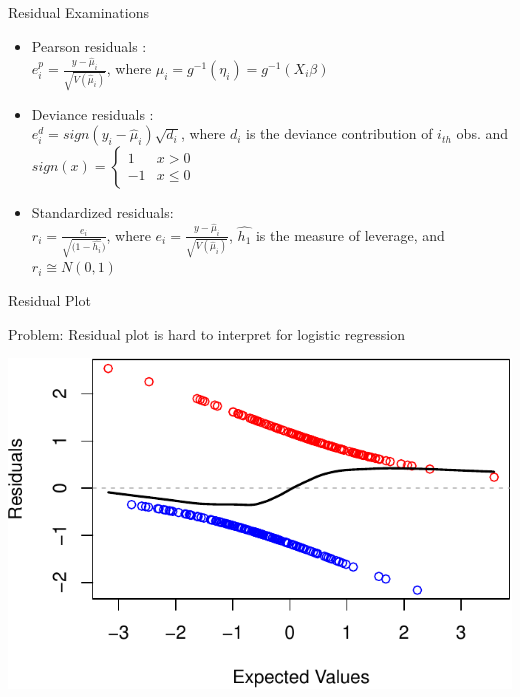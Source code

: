 \documentclass[ignorenonframetext,]{beamer}
\begin{document}
\begin{frame}{Residual Examinations}

\begin{itemize}
\item
  Pearson residuals :\\
  \(e_{i}^p=\frac{y-\hat\mu_{i}}{\sqrt{V(\hat\mu_{i})}}\), where
  \(\mu_i=g^{-1}(\eta_i)=g^{-1}(X_i\beta)\)
\item
  Deviance residuals :\\
  \(e_{i}^d= sign(y_i-\hat\mu_i)\sqrt{d_i}\), where \(d_i\) is the
  deviance contribution of \(i_{th}\) obs. and
  \(sign(x)=\begin{cases}1 & x>0\\-1 & x\le0\end{cases}\)
\item
  Standardized residuals:\\
  \(r_{i}= \frac{e_i}{\sqrt{(1- \widehat{h_i}})}\), where
  \(e_i= \frac{y-\hat\mu_i}{\sqrt{V(\hat\mu_{i})}}\), \(\widehat{h_1}\)
  is the measure of leverage, and \(r_i \cong N(0,1)\)
\end{itemize}

\end{frame}

\begin{frame}{Residual Plot}

Problem: Residual plot is hard to interpret for logistic regression

\includegraphics{lec7_files/figure-beamer/unnamed-chunk-1-1.pdf}

\end{frame}
\end{document}
